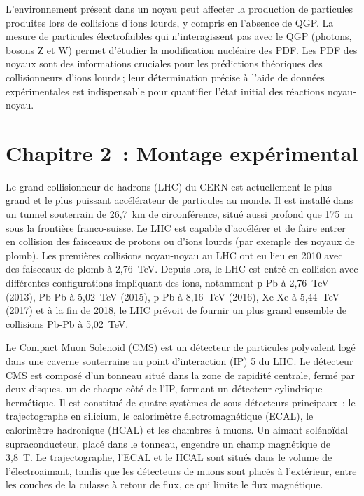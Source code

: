 L'environnement pr{\'e}sent dans un noyau peut affecter la production de particules produites lors de collisions d'ions lourds, y compris en l'absence de QGP. La mesure de particules {\'e}lectrofaibles qui n'interagissent pas avec le QGP (photons, bosons Z et W) permet d'{\'e}tudier la modification nucl{\'e}aire des PDF. Les PDF des noyaux sont des informations cruciales pour les pr{\'e}dictions th{\'e}oriques des collisionneurs d'ions lourds{\,;} leur d{\'e}termination pr{\'e}cise {\`a} l'aide de donn{\'e}es exp{\'e}rimentales est indispensable pour quantifier l'{\'e}tat initial des r{\'e}actions noyau-noyau.


\section*{Chapitre 2{~:} Montage exp{\'e}rimental}

Le grand collisionneur de hadrons (LHC) du CERN est actuellement le plus grand et le plus puissant acc{\'e}l{\'e}rateur de particules au monde. Il est install{\'e} dans un tunnel souterrain de {26,7}~\si{\km} de circonf{\'e}rence, situ{\'e} aussi profond que \SI{175}{\m} sous la fronti{\`e}re franco-suisse. Le LHC est capable d'acc{\'e}l{\'e}rer et de faire entrer en collision des faisceaux de protons ou d'ions lourds (par exemple des noyaux de plomb). Les premi{\`e}res collisions noyau-noyau au LHC ont eu lieu en 2010 avec des faisceaux de plomb {\`a} {2,76}~\si{\TeV}. Depuis lors, le LHC est entr{\'e} en collision avec diff{\'e}rentes configurations impliquant des ions, notamment p-Pb {\`a} {2,76}~\si{\TeV} (2013), Pb-Pb {\`a} {5,02}~\si{\TeV} (2015), p-Pb {\`a} {8,16}~\si{\TeV} (2016), Xe-Xe {\`a} {5,44}~\si{\TeV} (2017) et {\`a} la fin de 2018, le LHC pr{\'e}voit de fournir un plus grand ensemble de collisions Pb-Pb {\`a} {5,02}~\si{\TeV}.

Le Compact Muon Solenoid (CMS) est un d{\'e}tecteur de particules polyvalent log{\'e} dans une caverne souterraine au point d'interaction (IP) 5 du LHC. Le d{\'e}tecteur CMS est compos{\'e} d'un tonneau situ{\'e} dans la zone de rapidit{\'e} centrale, ferm{\'e} par deux disques, un de chaque c{\^o}t{\'e} de l'IP, formant un d{\'e}tecteur cylindrique herm{\'e}tique. Il est constitu{\'e} de quatre syst{\`e}mes de sous-d{\'e}tecteurs principaux{~:} le trajectographe en silicium, le calorim{\`e}tre {\'e}lectromagn{\'e}tique (ECAL), le calorim{\`e}tre hadronique (HCAL) et les chambres {\`a} muons. Un aimant sol{\'e}no{\"{i}}dal supraconducteur, plac{\'e} dans le tonneau, engendre un champ magn{\'e}tique de {3,8}~\si{\tesla}. Le trajectographe, l'ECAL et le HCAL sont situ{\'e}s dans le volume de l'{\'e}lectroaimant, tandis que les d{\'e}tecteurs de muons sont plac{\'e}s {\`a} l'ext{\'e}rieur, entre les couches de la culasse {\`a} retour de flux, ce qui limite le flux magn{\'e}tique.

